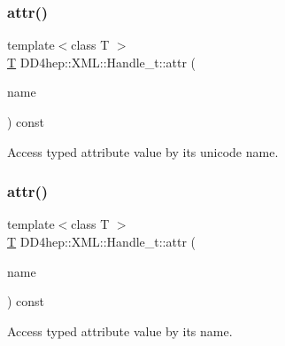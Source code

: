 \hypertarget{class_d_d4hep_1_1_x_m_l_1_1_handle__t_a252b09f45c91a31ca33fe0f858ef4121}{}\label{class_d_d4hep_1_1_x_m_l_1_1_handle__t_a252b09f45c91a31ca33fe0f858ef4121} 
\subsubsection{\texorpdfstring{attr()}{attr()}\hspace{0.1cm}{\footnotesize\ttfamily [2/10]}}
{\footnotesize\ttfamily template$<$class T $>$ \\
\hyperlink{class_t}{T} D\+D4hep\+::\+X\+M\+L\+::\+Handle\+\_\+t\+::attr (\begin{DoxyParamCaption}\item[{const \hyperlink{namespace_d_d4hep_1_1_x_m_l_a09e5d9cc86ed782f6826dfe0778c1815}{Xml\+Char} $\ast$}]{name }\end{DoxyParamCaption}) const}



Access typed attribute value by it\textquotesingle{}s unicode name. 

\hypertarget{class_d_d4hep_1_1_x_m_l_1_1_handle__t_af4044883cf0359ae3819a51ec029ef66}{}\label{class_d_d4hep_1_1_x_m_l_1_1_handle__t_af4044883cf0359ae3819a51ec029ef66} 
\subsubsection{\texorpdfstring{attr()}{attr()}\hspace{0.1cm}{\footnotesize\ttfamily [3/10]}}
{\footnotesize\ttfamily template$<$class T $>$ \\
\hyperlink{class_t}{T} D\+D4hep\+::\+X\+M\+L\+::\+Handle\+\_\+t\+::attr (\begin{DoxyParamCaption}\item[{const char $\ast$}]{name }\end{DoxyParamCaption}) const\hspace{0.3cm}{\ttfamily [inline]}}



Access typed attribute value by it\textquotesingle{}s name. 




